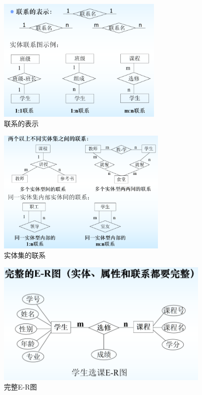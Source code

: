 \documentclass{article}
\begin{document}
\begin{figure}[H]
    
    \centering
    \includegraphics*[height = 6cm]{img/1.2-3.png}
    \caption{联系的表示}
\end{figure}

\begin{figure}[H]
    
    \centering
    \includegraphics*[height = 6cm]{img/1.2-4.png}
    \caption{实体集的联系}
\end{figure}

\begin{figure}[H]
    
    \centering
    \includegraphics*[height = 6cm]{img/1.2-5.png}
    \caption{完整E-R图}
\end{figure}
\end{document}
